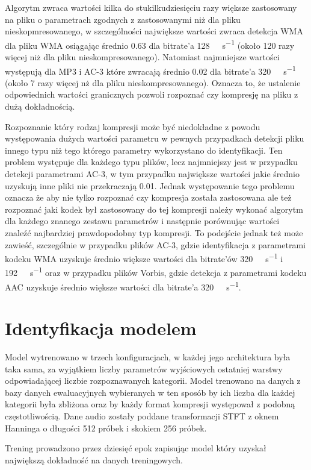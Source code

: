 \documentclass[pl,12pt]{aghdpl}
\let\Oldsection\section%
\renewcommand{\section}{\FloatBarrier\Oldsection}
\begin{document}
Algorytm zwraca wartości kilka do stukilkudziesięciu razy większe zastosowany na pliku o
parametrach zgodnych z zastosowanymi niż dla pliku nieskopmresowanego, w
szczególności największe wartości zwraca detekcja WMA dla pliku WMA osiągając
średnio \num{0.63} dla bitrate'a \SI{128}{\kibi\bit\per\second} (około 120
razy więcej niż dla pliku nieskompresowanego). Natomiast
najmniejsze wartości występują dla MP3 i AC-3 które zwracają średnio \num{0.02}
dla bitrate'a \SI{320}{\kibi\bit\per\second} (około 7 razy więcej nż dla pliku
nieskompresowanego). Oznacza to, że ustalenie odpowiednich wartości granicznych
pozwoli rozpoznać czy kompresję na pliku z dużą dokładnością.

Rozpoznanie który rodzaj kompresji może być niedokładne z powodu występowania
dużych wartości parametru w pewnych przypadkach detekcji pliku innego typu niż
tego którego parametry wykorzystano do identyfikacji. Ten problem występuje dla
każdego typu plików, lecz najmniejszy jest w przypadku detekcji parametrami
AC-3, w tym przypadku największe wartości jakie średnio uzyskują inne pliki nie
przekraczają \num{0.01}. Jednak występowanie tego problemu oznacza że aby nie
tylko rozpoznać czy kompresja została zastosowana ale też rozpoznać jaki kodek
był zastosowany do tej kompresji należy wykonać algorytm dla każdego znanego
zestawu parametrów i następnie porównując wartości znaleźć najbardziej
prawdopodobny typ kompresji. To podejście jednak też może zawieść, szczególnie
w przypadku plików AC-3, gdzie identyfikacja z parametrami kodeku WMA uzyskuje
średnio większe wartości dla bitrate'ów \SI{320}{\kibi\bit\per\second} i
\SI{192}{\kibi\bit\per\second} oraz w przypadku plików Vorbis, gdzie detekcja z
parametrami kodeku AAC uzyskuje średnio większe wartości dla bitrate'a
\SI{320}{\kibi\bit\per\second}.
\section{Identyfikacja modelem}
Model wytrenowano w trzech konfiguracjach, w każdej jego architektura była taka
sama, za wyjątkiem liczby parametrów wyjściowych ostatniej warstwy
odpowiadającej liczbie rozpoznawanych kategorii. Model trenowano na danych z
bazy danych ewaluacyjnych wybieranych w ten sposób by ich liczba dla każdej
kategorii była zbliżona oraz by każdy format kompresji występował z podobną
częstotliwością. Dane audio zostały poddane transformacji STFT z oknem Hanninga
o długości 512 próbek i skokiem 256 próbek.

Trening prowadzono przez dziesięć epok zapisując model który uzyskał największą
dokładność na danych treningowych.
\end{document}
